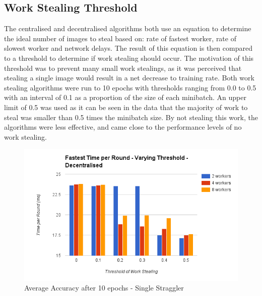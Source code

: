 \documentclass[12pt]{article}
\begin{document}
\subsection{Work Stealing Threshold}
The centralised and decentralised algorithms both use an equation to determine the ideal number of images to steal based on: rate of fastest worker, rate of slowest worker and network delays. The result of this equation is then compared to a threshold to determine if work stealing should occur. The motivation of this threshold was to prevent many small work stealings, as it was perceived that stealing a single image would result in a net decrease to training rate.
\newline
\newline
Both work stealing algorithms were run to 10 epochs with thresholds ranging from 0.0 to 0.5 with an interval of 0.1 as a proportion of the size of each minibatch. An upper limit of 0.5 was used as it can be seen in the data that the majority of work to steal was smaller than 0.5 times the minibatch size. By not stealing this work, the algorithms were less effective, and came close to the performance levels of no work stealing.

\begin{figure}[H]
  \centering
  \includegraphics[width=6in]{FastestThresholdDecentralised}
  \caption[]{Average Accuracy after 10 epochs - Single Straggler}
  \label{FastestThresholdDecentralised}
\end{figure}
\end{document}
